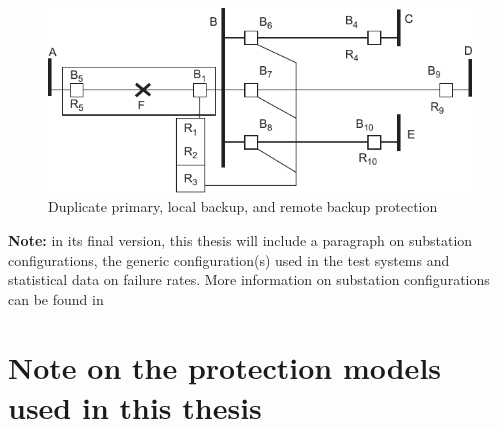 \begin{figure}
    \centering
    \includegraphics[width=0.8\linewidth]{Figs/ProtectionBackup.pdf}
    \caption{Duplicate primary, local backup, and remote backup protection~\cite{HorowitzBook}}
    \label{fig:protectionBackup}
\end{figure}

\textbf{Note:} in its final version, this thesis will include a paragraph on substation configurations, the generic configuration(s) used in the test systems and statistical data on failure rates. More information on substation configurations can be found in~\cite{3rdZoneRevisited}




\section{Note on the protection models used in this thesis}
\label{sec:noteOnProtections}

